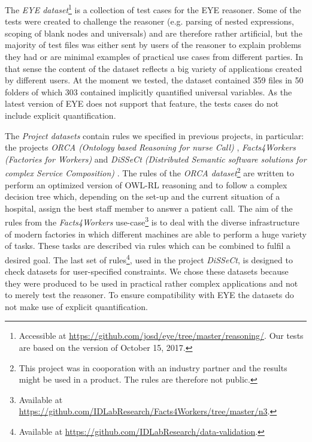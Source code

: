 The \emph{EYE dataset}\footnote{Accessible at \url{https://github.com/josd/eye/tree/master/reasoning/}. Our tests are based on the version of October 15, 2017.} 
%
is a collection of test cases for the EYE reasoner.
Some of the tests were created to challenge the reasoner (e.g. parsing of nested expressions, scoping of blank nodes and universals)
and are therefore rather artificial, 
 but the majority of test files was either sent by users of the reasoner to explain problems they had or are minimal examples of practical use cases from different parties.
 In that sense 
 the content of the dataset 
 reflects a big variety of applications created by different users.
 At the moment we tested, the dataset contained 359 \nthree files in 50 folders of which 303 contained implicitly 
quantified universal variables. 
As the latest version of EYE does not support that feature, the tests cases do not include explicit quantification. 

The \emph{Project datasets} contain rules we specified in previous projects, in particular: 
the projects \emph{ORCA (Ontology based Reasoning for nurse Call)} \cite{ORCA,ORCA2}, \emph{Facts4Workers (Factories for Workers)} \cite{arndt_ruleml_industry_2016} 
and \emph{DiSSeCt (Distributed Semantic software solutions for complex Service Composition)}
\cite{ruleml2017}. 
The rules of the 
\emph{ORCA dataset}\footnote{This 
project was in cooporation with an industry partner and the results might be used in a product. The rules are therefore not public.}
 are written to perform an optimized version of OWL-RL reasoning and to follow a complex decision tree which, depending on the set-up and the 
current situation of a hospital, assign the best staff member to answer a patient call. 
%
The aim of the rules from the \emph{Facts4Workers} use-case\footnote{Available at \url{https://github.com/IDLabResearch/Facts4Workers/tree/master/n3}.}
is to deal with the diverse infrastructure of modern factories in which different machines are able to perform a huge variety of tasks.
These tasks are described via rules which can be combined to fulfil a desired goal.
%
The last set of rules\footnote{Available at \url{https://github.com/IDLabResearch/data-validation}. },
used in the project \emph{DiSSeCt}, is designed to check \rdf datasets for user-specified constraints. 
%
We chose these datasets because they were produced to be used in practical rather complex applications and not to merely test the reasoner. 
To ensure compatibility with EYE
the datasets do not make use of explicit quantification.

